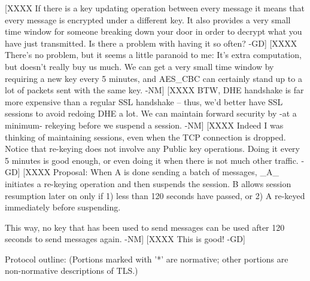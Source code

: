 [XXXX If there is a key updating operation between every message it means
that every message is encrypted under a different key. It also
provides a very small time window for someone breaking down your door
in order to decrypt what you have just transmitted. Is there a problem
with having it so often? -GD]
[XXXX There's no problem, but it seems a little paranoid to me: It's
extra computation, but doesn't really buy us much.  We can get a very
small time window by requiring a new key every 5 minutes, and AES_CBC
can certainly stand up to a lot of packets sent with the same
key. -NM]
[XXXX BTW, DHE handshake is far more expensive than a regular SSL
handshake -- thus, we'd better have SSL sessions to avoid redoing DHE
a lot.  We can maintain forward security by -at a minimum- rekeying
before we suspend a session. -NM]
[XXXX Indeed I was thinking of maintaining sessions, even when the TCP
connection is dropped. Notice that re-keying does not involve any
Public key operations. Doing it every 5 minutes is good enough, or
even doing it when there is not much other traffic. -GD]
[XXXX
 Proposal: When A is done sending a batch of messages, _A_ initiates a
   re-keying operation and then suspends the session.  B allows
   session resumption later on only if 1) less than 120 seconds have
   passed, or 2) A re-keyed immediately before suspending.

   This way, no key that has been used to send messages can be used
   after 120 seconds to send messages again. -NM]
[XXXX
   This is good! -GD]

Protocol outline: (Portions marked with '*' are normative; other
portions are non-normative descriptions of TLS.)

